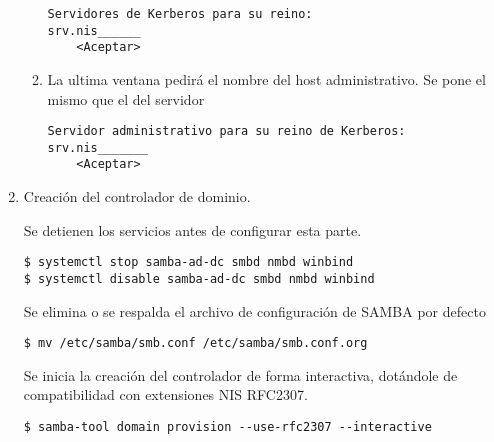 \documentclass[../main.tex]{subfiles}
\begin{document}
\begin{enumerate}
\begin{enumerate}
                \begin{listing}[H]
\begin{verbatim}
Servidores de Kerberos para su reino:
srv.nis______
    <Aceptar>
\end{verbatim}
\end{listing}

          \item La ultima ventana pedirá el nombre del host administrativo.
                Se pone el mismo que el del servidor

                \begin{listing}[H]
\begin{verbatim}
Servidor administrativo para su reino de Kerberos:
srv.nis_______
    <Aceptar>
\end{verbatim}
\end{listing}



        \end{enumerate}

  \item Creación del controlador de dominio.

        Se detienen los servicios antes de configurar esta parte.

        \begin{listing}[H]
\begin{verbatim}
$ systemctl stop samba-ad-dc smbd nmbd winbind
$ systemctl disable samba-ad-dc smbd nmbd winbind
\end{verbatim}
\end{listing}

        Se elimina o se respalda el archivo de configuración de
        SAMBA por defecto
        \begin{listing}[H]
\begin{verbatim}
$ mv /etc/samba/smb.conf /etc/samba/smb.conf.org
\end{verbatim}
\end{listing}

        Se inicia la creación del controlador de forma interactiva, dotándole de compatibilidad con extensiones NIS RFC2307.

        \begin{listing}[H]
\begin{verbatim}
$ samba-tool domain provision --use-rfc2307 --interactive
\end{verbatim}
\end{listing}


\end{enumerate}
\end{document}
